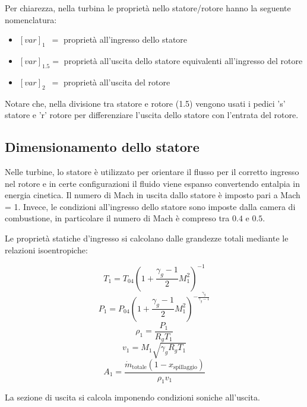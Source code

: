 Per chiarezza, nella turbina le proprietà nello statore/rotore hanno la seguente nomenclatura:
\begin{itemize}
    \item $[var]_1 \,\,\,=$ proprietà all'ingresso dello statore
    \item $[var]_\text{1.5} =$ proprietà all'uscita dello statore equivalenti all'ingresso del rotore
    \item $[var]_\text{2}\,\,\,=$ proprietà all'uscita del rotore
\end{itemize}

Notare che, nella divisione tra statore e rotore (1.5) vengono usati i pedici 's' statore e 'r' rotore per differenziare l'uscita dello statore con l'entrata del rotore. 


\subsection{Dimensionamento dello statore}
Nelle turbine, lo statore è utilizzato per orientare il flusso per il corretto ingresso nel rotore e in certe configurazioni il fluido viene espanso convertendo entalpia in energia cinetica. Il numero di Mach in uscita dallo statore è imposto pari a Mach = 1. Invece, le condizioni all'ingresso dello statore sono imposte dalla camera di combustione, in particolare il numero di Mach è compreso tra $0.4$ e $0.5$.

Le proprietà statiche d'ingresso si calcolano dalle grandezze totali mediante le relazioni isoentropiche:

\begin{equation*}
T_1 = T_{04} \left( 1 + \frac{\gamma_g - 1}{2} M_1^2 \right)^{-1}
\end{equation*}
\begin{equation*}
P_1= P_{04} \left( 1 + \frac{\gamma_g - 1}{2} M_1^2 \right)^{-\frac{\gamma_g}{\gamma_g - 1}} 
\end{equation*}
\begin{equation*}
    \rho_1 = \frac{P_1}{R_g T_1} 
\end{equation*}
\begin{equation*}
    v_1 = M_1 \sqrt{\gamma_g R_g T_1} 
\end{equation*}
\begin{equation*}
    A_1 = \frac{\dot{m}_\text{totale}(1-x_\text{spillaggio})}{\rho_1 v_1}
\end{equation*}


La sezione di uscita si calcola imponendo condizioni soniche all'uscita.

